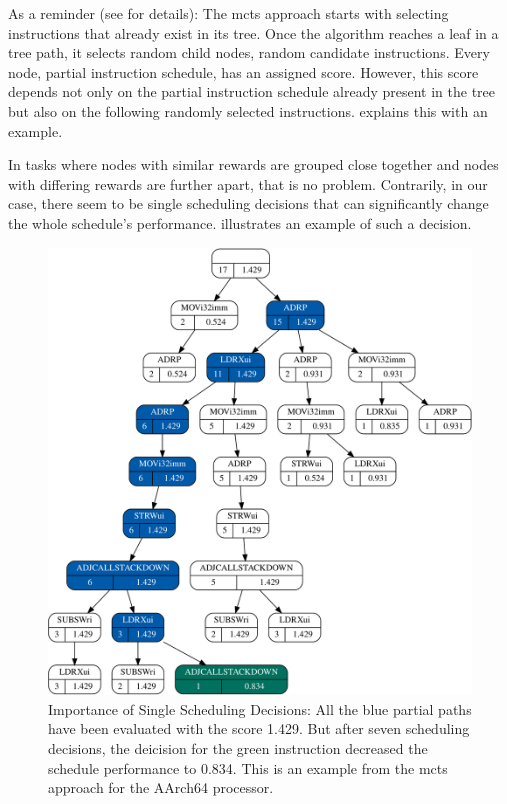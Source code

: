 As a reminder (see  for details): The \ac{mcts} approach starts with selecting instructions that already exist in its tree.
Once the algorithm reaches a leaf in a tree path, it selects random child nodes, \ie random candidate instructions.
Every node, \ie partial instruction schedule, has an assigned score.
However, this score depends not only on the partial instruction schedule already present in the tree but also on the following randomly selected instructions.
 explains this with an example.

In tasks where nodes with similar rewards are grouped close together and nodes with differing rewards are further apart, that is no problem.
Contrarily, in our case, there seem to be single scheduling decisions that can significantly change the whole schedule's performance.
 illustrates an example of such a decision.
\begin{figure}
    \includegraphics[width=\textwidth]{img/mcts-scores/2-crop.pdf}
    \caption[Importance of Single Scheduling Decisions]{Importance of Single Scheduling Decisions: All the blue partial paths have been evaluated with the score 1.429. 
    But after seven scheduling decisions, the deicision for the green instruction decreased the schedule performance to 0.834.
    This is an example from the \ac{mcts} approach for the AArch64 processor.}
    \label{fig:eval:changing-performance}
\end{figure}

